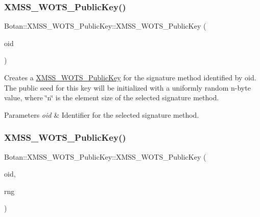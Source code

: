 \subsubsection{\texorpdfstring{X\+M\+S\+S\+\_\+\+W\+O\+T\+S\+\_\+\+Public\+Key()}{XMSS\_WOTS\_PublicKey()}\hspace{0.1cm}{\footnotesize\ttfamily [1/6]}}
{\footnotesize\ttfamily Botan\+::\+X\+M\+S\+S\+\_\+\+W\+O\+T\+S\+\_\+\+Public\+Key\+::\+X\+M\+S\+S\+\_\+\+W\+O\+T\+S\+\_\+\+Public\+Key (\begin{DoxyParamCaption}\item[{X\+M\+S\+S\+\_\+\+W\+O\+T\+S\+\_\+\+Parameters\+::ots\+\_\+algorithm\+\_\+t}]{oid }\end{DoxyParamCaption})\hspace{0.3cm}{\ttfamily [inline]}}

Creates a \hyperlink{class_botan_1_1_x_m_s_s___w_o_t_s___public_key}{X\+M\+S\+S\+\_\+\+W\+O\+T\+S\+\_\+\+Public\+Key} for the signature method identified by oid. The public seed for this key will be initialized with a uniformly random n-\/byte value, where \char`\"{}n\char`\"{} is the element size of the selected signature method.


\begin{DoxyParams}{Parameters}
{\em oid} & Identifier for the selected signature method. \\
\hline
\end{DoxyParams}
\mbox{\label{class_botan_1_1_x_m_s_s___w_o_t_s___public_key_a3fb0d9f974c41f2be8c5e14a0ad39403}} 
\subsubsection{\texorpdfstring{X\+M\+S\+S\+\_\+\+W\+O\+T\+S\+\_\+\+Public\+Key()}{XMSS\_WOTS\_PublicKey()}\hspace{0.1cm}{\footnotesize\ttfamily [2/6]}}
{\footnotesize\ttfamily Botan\+::\+X\+M\+S\+S\+\_\+\+W\+O\+T\+S\+\_\+\+Public\+Key\+::\+X\+M\+S\+S\+\_\+\+W\+O\+T\+S\+\_\+\+Public\+Key (\begin{DoxyParamCaption}\item[{X\+M\+S\+S\+\_\+\+W\+O\+T\+S\+\_\+\+Parameters\+::ots\+\_\+algorithm\+\_\+t}]{oid,  }\item[{Random\+Number\+Generator \&}]{rng }\end{DoxyParamCaption})\hspace{0.3cm}{\ttfamily [inline]}}

